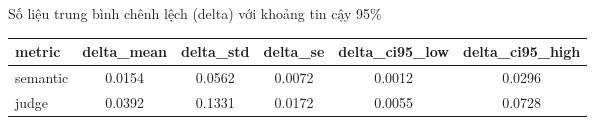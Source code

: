 \setlength{\arrayrulewidth}{1pt}%
\begin{table}{Số liệu trung bình chênh lệch (delta) với khoảng tin cậy 95\%}
    \centering
    \renewcommand{\arraystretch}{1.2}
    \setlength{\tabcolsep}{4pt}
    \begin{tabular}{|l|S[table-format=1.4]|S[table-format=1.4]|S[table-format=1.4]|S[table-format=1.4]|S[table-format=1.4]|}
        \hline
        	\textbf{metric} & \textbf{delta\_mean} & \textbf{delta\_std} & \textbf{delta\_se} & \textbf{delta\_ci95\_low} & \textbf{delta\_ci95\_high} \\
        \hline
        semantic & 0.0154 & 0.0562 & 0.0072 & 0.0012 & 0.0296 \\
        \hline
        judge    & 0.0392 & 0.1331 & 0.0172 & 0.0055 & 0.0728 \\
        \hline
    \end{tabular}
\end{table}
